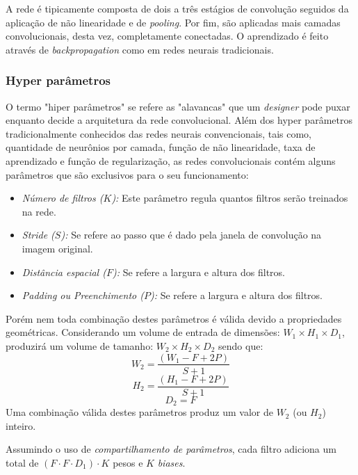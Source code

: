 A rede é tipicamente composta de dois a três estágios de convolução seguidos da
aplicação de não linearidade e de \emph{pooling}. Por fim, são aplicadas mais
camadas convolucionais, desta vez, completamente conectadas. O aprendizado é
feito através de \emph{backpropagation} como em redes neurais
tradicionais.\cite{lecun2015deep}

\subsubsection{Hyper parâmetros}

O termo "hiper parâmetros" se refere as "alavancas" que um \emph{designer} pode
puxar enquanto decide a arquitetura da rede convolucional. Além dos hyper
parâmetros tradicionalmente conhecidos das redes neurais convencionais, tais
como, quantidade de neurônios por camada, função de não linearidade, taxa de
aprendizado e função de regularização, as redes convolucionais contém alguns
parâmetros que são exclusivos para o seu funcionamento:

\begin{itemize}

  \item \emph{Número de filtros ($K$):} Este parâmetro regula quantos filtros serão
    treinados na rede.
  \item \emph{Stride ($S$):} Se refere ao passo que é dado pela
    janela de convolução na imagem original.
  \item \emph{Distância espacial ($F$):}
    Se refere a largura e altura dos filtros.
  \item \emph{Padding ou Preenchimento
      ($P$):} Se refere a largura e altura dos filtros.

\end{itemize}

Porém nem toda combinação destes parâmetros é válida devido a propriedades
geométricas. Considerando um volume de entrada de dimensões: $W_1 \times H_1 \times D_1$,
produzirá um volume de tamanho: $W_2 \times H_2 \times D_2$ sendo que:
$$ W_2= \frac{(W_1-F+2P)}{S+1} $$
$$ H_2= \frac{(H_1-F+2P)}{S+1} $$
$$ D_2= F $$
Uma combinação válida destes parâmetros produz um valor de $W_2$ (ou $H_2$)
inteiro.

Assumindo o uso de \emph{compartilhamento de parâmetros}, cada filtro adiciona
um total de $(F \cdot F \cdot D_1)\cdot K$ pesos e $K$ \emph{biases}.

